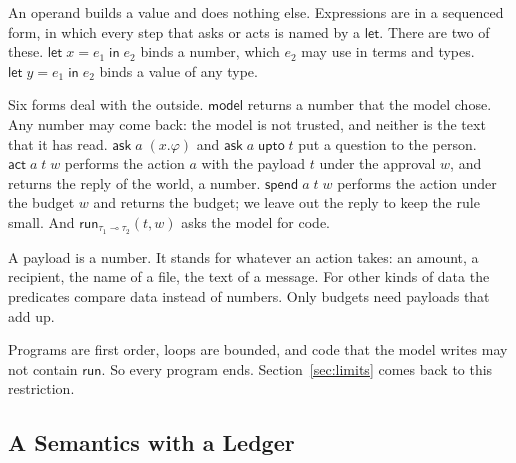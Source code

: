 \documentclass[acmsmall,nonacm,screen]{acmart}
\newcommand{\kw}[1]{\mathsf{#1}}
\newcommand{\model}{\kw{model}}
\newcommand{\letin}[3]{\kw{let}\;#1 = #2\;\kw{in}\;#3}
\newcommand{\ask}[2]{\kw{ask}\;#1\;(#2)}
\newcommand{\askupto}[2]{\kw{ask}\;#1\;\kw{upto}\;#2}
\newcommand{\act}[3]{\kw{act}\;#1\;#2\;#3}
\newcommand{\spend}[3]{\kw{spend}\;#1\;#2\;#3}
\newcommand{\run}[4]{\kw{run}_{#1 \multimap #2}(#3, #4)}
\begin{document}
An operand builds a value and does nothing else. Expressions are in a sequenced form, in which
every step that asks or acts is named by a $\kw{let}$. There are two of these.
$\letin{x}{e_1}{e_2}$ binds a number, which $e_2$ may use in terms and types.
$\letin{y}{e_1}{e_2}$ binds a value of any type.

Six forms deal with the outside. $\model$ returns a number that the model chose. Any number may
come back: the model is not trusted, and neither is the text that it has read.
$\ask{a}{x.\varphi}$ and $\askupto{a}{t}$ put a question to the person. $\act{a}{t}{w}$
performs the action $a$ with the payload $t$ under the approval $w$, and returns the reply of
the world, a number. $\spend{a}{t}{w}$ performs the action under the budget $w$ and returns the
budget; we leave out the reply to keep the rule small. And $\run{\tau_1}{\tau_2}{t}{w}$ asks
the model for code.

A payload is a number. It stands for whatever an action takes: an amount, a recipient, the
name of a file, the text of a message. For other kinds of data the predicates compare data
instead of numbers. Only budgets need payloads that add up.

Programs are first order, loops are bounded, and code that the model writes may not contain
$\kw{run}$. So every program ends. Section~\ref{sec:limits} comes back to this restriction.

\subsection{A Semantics with a Ledger}
\label{sec:ledger}
\end{document}

